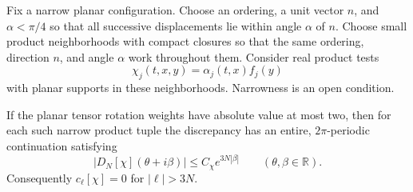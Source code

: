 \documentclass[11pt, letterpaper, reqno]{amsart}
\theoremstyle{definition}
\newenvironment{proposition}
{\pushQED{\qed}\renewcommand{\qedsymbol}{$\blacksquare$}\propositionx}
{\popQED\endpropositionx}
\theoremstyle{remark}
\newcommand{\bbR}{\mathbb{R}}
\begin{document}
Fix a narrow planar configuration. Choose an ordering, a unit vector
$n$, and $\alpha<\pi/4$ so that all successive displacements lie
within angle $\alpha$ of $n$. Choose small product neighborhoods with
compact closures so that the same ordering, direction $n$, and
angle $\alpha$ work throughout them. Consider real product tests
\[
 \chi_j(t,x,y)=\alpha_j(t,x)f_j(y)
\]
with planar supports in these neighborhoods. Narrowness is an open condition.

\begin{proposition}\label{prop:final-growth}
If the planar tensor rotation weights have absolute value at most two,
then for each such narrow product tuple the discrepancy has an entire,
$2\pi$-periodic continuation satisfying
\begin{equation}\label{eq:final-growth}
 |D_N[\chi](\theta+i\beta)|\le C_\chi e^{3N|\beta|}
 \qquad(\theta,\beta\in\bbR).
\end{equation}
Consequently $c_\ell[\chi]=0$ for $|\ell|>3N$.
\end{proposition}
\end{document}
